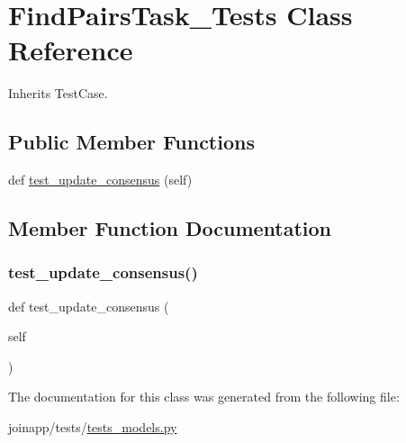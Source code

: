 \hypertarget{classjoinapp_1_1tests_1_1tests__models_1_1_find_pairs_task___tests}{}\section{Find\+Pairs\+Task\+\_\+\+Tests Class Reference}
\label{classjoinapp_1_1tests_1_1tests__models_1_1_find_pairs_task___tests}


Inherits Test\+Case.

\subsection*{Public Member Functions}
\begin{DoxyCompactItemize}
\item 
def \mbox{\hyperlink{classjoinapp_1_1tests_1_1tests__models_1_1_find_pairs_task___tests_a42549850130eb7841e5ca9614e2b4c5a}{test\+\_\+update\+\_\+consensus}} (self)
\end{DoxyCompactItemize}


\subsection{Member Function Documentation}
\mbox{\label{classjoinapp_1_1tests_1_1tests__models_1_1_find_pairs_task___tests_a42549850130eb7841e5ca9614e2b4c5a}} 
\subsubsection{\texorpdfstring{test\_update\_consensus()}{test\_update\_consensus()}}
{\footnotesize\ttfamily def test\+\_\+update\+\_\+consensus (\begin{DoxyParamCaption}\item[{}]{self }\end{DoxyParamCaption})}



The documentation for this class was generated from the following file\+:\begin{DoxyCompactItemize}
\item 
joinapp/tests/\mbox{\hyperlink{tests__models_8py}{tests\+\_\+models.\+py}}\end{DoxyCompactItemize}
